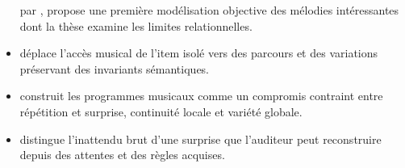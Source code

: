 \documentclass[11pt,a4paper]{article}
\begin{document}
\begin{itemize}
        par \textcite{pachet2006clefs}, propose une première modélisation objective
        des mélodies intéressantes dont la thèse examine les limites relationnelles.
  \item \textcite{pachet1999active} déplace l'accès musical de l'item isolé vers
        des parcours et des variations préservant des invariants sémantiques.
  \item \textcite{pachet1999programs} construit les programmes musicaux comme un
        compromis contraint entre répétition et surprise, continuité locale et
        variété globale.
  \item \textcite{pachet1999surprising} distingue l'inattendu brut d'une surprise
        que l'auditeur peut reconstruire depuis des attentes et des règles acquises.
\end{itemize}

\printbibliography[keyword={francois-pachet},title={Travaux de François Pachet}]
\printbibliography[notkeyword={francois-pachet},title={Autres références}]
\end{document}
